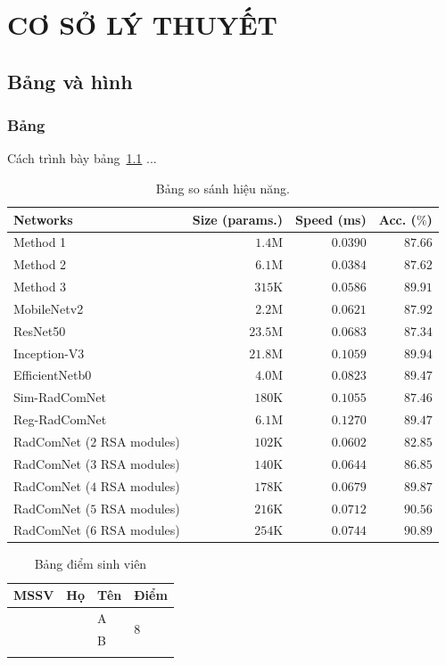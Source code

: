 \chapter{CƠ SỞ LÝ THUYẾT}
\section{Bảng và hình}
\subsection{Bảng}
Cách trình bày bảng~\ref{tab01} ... 

\begin{table}[!h]
\footnotesize
\caption{Bảng so sánh hiệu năng.}
\begin{tabular}{@{}l r r r@{}}
\hline
\multirow{1}{*}{Networks}	& Size (params.) & Speed (ms) & Acc. ($\%$)  \\ \hline
Method 1 &$	1.4\mathrm{M}	$&$	0.0390	$&$	87.66	$\\
Method 2	&$	6.1\mathrm{M}	$&$	0.0384	$&$	87.62	$\\
Method 3 &$	315\mathrm{K}	$&$	0.0586	$&$	89.91	$\\
MobileNetv2&$	2.2\mathrm{M}	$&$	0.0621	$&$	87.92	$\\
ResNet50&$	23.5\mathrm{M}	$&$	0.0683	$&$	87.34	$\\
Inception-V3&$	21.8\mathrm{M}	$&$	0.1059	$&$	89.94	$\\
EfficientNetb0&$	4.0\mathrm{M}	$&$	0.0823	$&$	89.47	$\\ 
Sim-RadComNet	&$	180\mathrm{K}		$&$	0.1055	$&$	87.46	$\\
Reg-RadComNet	&$	6.1\mathrm{M}		$&$	0.1270	$&$	89.47	$\\ \hline
RadComNet ($2$ RSA modules)	&$	102\mathrm{K}		$&$	0.0602	$&$	82.85	$\\
RadComNet ($3$ RSA modules)	&$	140\mathrm{K}		$&$	0.0644	$&$	86.85	$\\
RadComNet ($4$ RSA modules)	&$	178\mathrm{K}		$&$	0.0679	$&$	89.87	$\\
RadComNet ($5$ RSA modules)	&$	216\mathrm{K}		$&$	0.0712	$&$	90.56	$\\
RadComNet ($6$ RSA modules)	&$	254\mathrm{K}		$&$	0.0744	$&$	90.89	$\\
\hline
\end{tabular}
\label{tab01}
\end{table}

\begin{table}[!h]
\caption{Bảng điểm sinh viên}
\begin{tabular}{llll}
\hline
\multicolumn{1}{c}{MSSV} & \multicolumn{1}{c}{Họ} & \multicolumn{1}{c}{Tên} & \multicolumn{1}{c}{Điểm} \\ \hline
                         &                        & A                       & \multirow{2}{*}{8}       \\
                         &                        & B                       &                          \\
                         &                        &                         &                         
\end{tabular}
\label{tab02}
\end{table}

